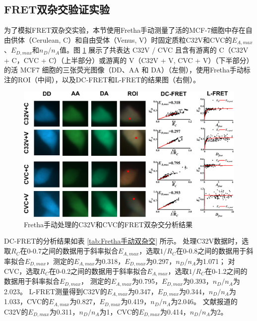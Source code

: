\subsection{FRET双杂交验证实验}
\label{sec:模型质粒FRET双杂交验证实验}

为了模拟FRET双杂交实验，本节使用Fretha手动测量了活的MCF-7细胞中存在自由供体（Cerulean, C）和自由受体（Venus, V）时固定质粒C32V和CVC的$E_{A,max}$、$E_{D,max}$和$n_D/n_A$值。图 \ref{fig:Fretha手动双杂交} 展示了共表达 C32V / CVC 且含有游离的 C（C32V + C，CVC + C）（上半部分）或游离的 V（C32V + V, CVC + V）（下半部分）的活 MCF7 细胞的三张荧光图像（DD、AA 和 DA）（左侧），使用Fretha手动标注的ROI（中间），以及DC-FRET和L-FRET的结果图（右侧）。
\begin{figure}
  \centering
  \includegraphics[width=1\linewidth]{../figures/3/Fretha手动双杂交数据处理.png}
  \caption{Fretha手动处理的C32V和CVC的FRET双杂交分析结果}
  \label{fig:Fretha手动双杂交}
\end{figure}

DC-FRET的分析结果如表 \ref{tab:Fretha手动双杂交} 所示。
处理C32V数据时，选取$R_C$在0-0.7之间的数据用于斜率拟合$E_{A,max}$，选取$1/R_C$在0-0.8之间的数据用于斜率拟合$E_{D,max}$，测定的$E_{A,max}$为0.318，$E_{D,max}$为0.297，$n_D/n_A$为1.071；
对CVC，选取$R_C$在0-0.2之间的数据用于斜率拟合$E_{A,max}$，选取$1/R_C$在0-1.2之间的数据用于斜率拟合$E_{D,max}$，
测定的$E_{A,max}$为0.795，$E_{D,max}$为0.393，$n_D/n_A$为2.023。
L-FRET测量得到C32V的$E_{A,max}$为0.347，$E_{D,max}$为0.344，$n_D/n_A$为1.033，CVC的$E_{A,max}$为0.827，$E_{D,max}$为0.419，$n_D/n_A$为2.046。
文献报道的C32V的$E_{D,max}$为0.311，$n_D/n_A$为1，CVC的$E_{D,max}$为0.414，$n_D/n_A$为2。


